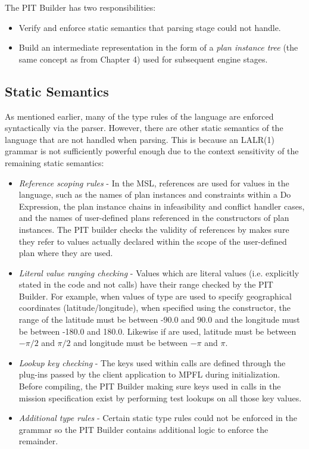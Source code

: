 The PIT Builder has two responsibilities:
\begin{itemize}
\item Verify and enforce static semantics that parsing stage could not handle.
\item Build an intermediate representation in the form of a \emph{plan instance tree} (the same concept as from Chapter 4) used for subsequent engine stages.
\end{itemize}

\subsection{Static Semantics}
As mentioned earlier, many of the type rules of the language are enforced syntactically via the parser. However, there are other static semantics of the language that are not handled when parsing. This is because an LALR(1) grammar is not sufficiently powerful enough due to the context sensitivity of the remaining static semantics:
\begin{itemize}
\item \textit{Reference scoping rules} - In the MSL, references are used for values in the language, such as the names of plan instances and constraints within a Do Expression, the plan instance chains in infeasibility and conflict handler cases, and the names of user-defined plans referenced in the constructors of  plan instances. The PIT builder checks the validity of references by makes sure they refer to values actually declared within the scope of the user-defined plan where they are used.
\item \textit{Literal value ranging checking} - Values which are literal values (i.e. explicitly stated in the code and not  calls) have their range checked by the PIT Builder. For example, when values of type  are used to specify geographical coordinates (latitude/longitude), when specified using the  constructor, the range of the latitude must be between -90.0 and 90.0 and the longitude must be between -180.0 and 180.0. Likewise if  are used, latitude must be between $-\pi/2$ and $\pi/2$ and longitude must be between $-\pi$ and $\pi$.
\item \textit{Lookup key checking} - The keys used within  calls are defined through the plug-ins passed by the client application to MPFL during initialization. Before compiling, the PIT Builder making sure keys used in  calls in the mission specification exist by performing test lookups on all those key values.
\item \textit{Additional type rules} - Certain static type rules could not be enforced in the grammar so the PIT Builder contains additional logic to enforce the remainder.
\end{itemize}

